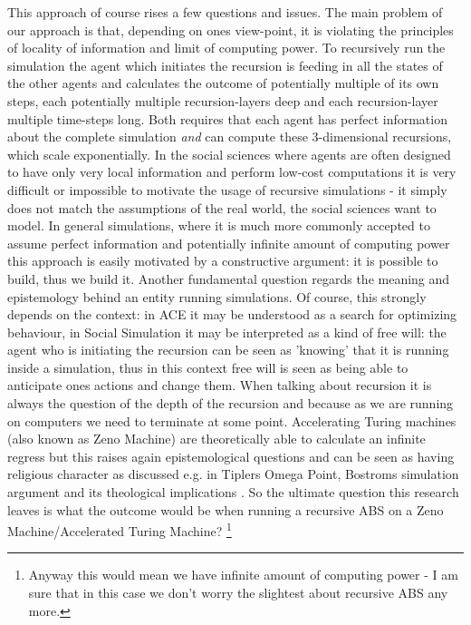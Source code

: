 This approach of course rises a few questions and issues. The main problem of our approach is that, depending on ones view-point, it is violating the principles of locality of information and limit of computing power. To recursively run the simulation the agent which initiates the recursion is feeding in all the states of the other agents and calculates the outcome of potentially multiple of its own steps, each potentially multiple recursion-layers deep and each recursion-layer multiple time-steps long. Both requires that each agent has perfect information about the complete simulation \textit{and} can compute these 3-dimensional recursions, which scale exponentially. In the social sciences where agents are often designed to have only very local information and perform low-cost computations it is very difficult or impossible to motivate the usage of recursive simulations - it simply does not match the assumptions of the real world, the social sciences want to model. In general simulations, where it is much more commonly accepted to assume perfect information and potentially infinite amount of computing power this approach is easily motivated by a constructive argument: it is possible to build, thus we build it.
Another fundamental question regards the meaning and epistemology behind an entity running simulations. Of course, this strongly depends on the context: in ACE it may be understood as a search for optimizing behaviour, in Social Simulation it may be interpreted as a kind of free will: the agent who is initiating the recursion can be seen as 'knowing' that it is running inside a simulation, thus in this context free will is seen as being able to anticipate ones actions and change them.
When talking about recursion it is always the question of the depth of the recursion and because as we are running on computers we need to terminate at some point. Accelerating Turing machines (also known as Zeno Machine) are theoretically able to calculate an infinite regress but this raises again epistemological questions and can be seen as having religious character as discussed e.g. in Tiplers Omega Point, Bostroms simulation argument \cite{bostrom_are_2003} and its theological implications \cite{steinhart_theological_2010}. So the ultimate question this research leaves is what the outcome would be when running a recursive ABS on a Zeno Machine/Accelerated Turing Machine? \footnote{Anyway this would mean we have infinite amount of computing power - I am sure that in this case we don't worry the slightest about recursive ABS any more.}

